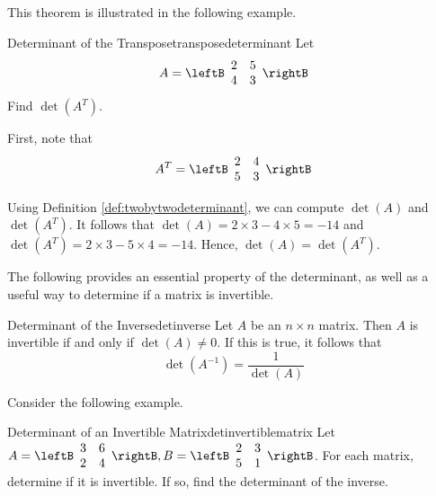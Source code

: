 This theorem is illustrated in the following example. 

\begin{example}{Determinant of the Transpose}{transposedeterminant}
Let
\begin{equation*}
A
=
\leftB
\begin{array}{rr}
2 & 5 \\
4 & 3
\end{array}
\rightB
\end{equation*}
Find $\det \left(A^T\right)$.
\end{example}

\begin{solution}
First, note that 
\begin{equation*}
A^{T}
=
\leftB
\begin{array}{rr}
2 & 4 \\
5 & 3
\end{array}
\rightB
\end{equation*}

Using Definition \ref{def:twobytwodeterminant}, we can compute $\det \left(A\right)$ and $\det \left(A^T\right)$. It follows that
$\det \left(A\right) = 2 \times 3 - 4 \times 5 = -14$ and $\det \left(A^T\right) = 2 \times 3 - 5 \times 4 = -14$. 
Hence, $\det \left(A\right) = \det \left(A^T\right)$.
\end{solution}

The following provides an essential property of the determinant, as well as a useful way to determine if a matrix is invertible.

\begin{theorem}{Determinant of the Inverse}{detinverse}
Let $A$ be an $n \times n$ matrix. Then $A$ is invertible if and only if $\det(A) \neq 0$. If this is true, it follows that 
\[
\det(A^{-1}) = \frac{1}{\det(A)}
\]
\end{theorem}

Consider the following example.

\begin{example}{Determinant of an Invertible Matrix}{detinvertiblematrix}
Let $A = \leftB \begin{array}{rr}
3 & 6 \\
2 & 4 
\end{array} \rightB, B = \leftB \begin{array}{rr}
2 & 3 \\
5 & 1
\end{array} \rightB$. For each matrix, determine if it is invertible. If so, find the determinant of the inverse. 
\end{example}

